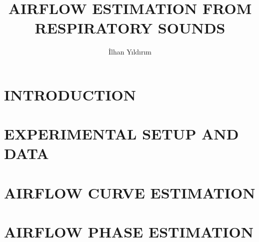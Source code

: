 \documentclass[a4paper,onesided,12pt]{report}
\title{AIRFLOW ESTIMATION FROM RESPIRATORY SOUNDS}
\author{İlhan Yıldırım}
\begin{document}
	
	\makemstitle %
	\makeapprovalpage
\chapter{INTRODUCTION}
\chapter{EXPERIMENTAL SETUP AND DATA}
\chapter{AIRFLOW CURVE ESTIMATION}




\chapter{AIRFLOW PHASE ESTIMATION}

\end{document}
